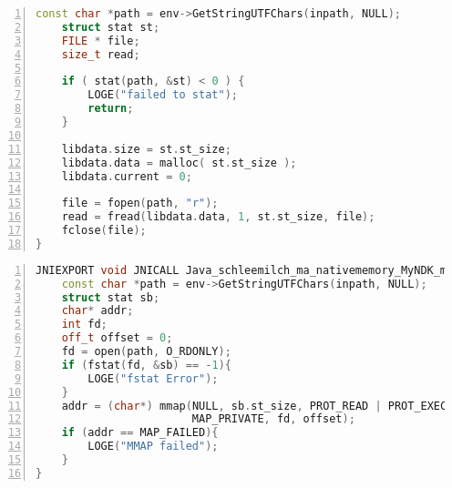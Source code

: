 \begin{appendices}
\begin{lstlisting}[language=C++, caption=File Mapping with malloc(), label=file_mapping_malloc, numbers=left]
    const char *path = env->GetStringUTFChars(inpath, NULL);
    struct stat st;
    FILE * file;
    size_t read;

    if ( stat(path, &st) < 0 ) {
        LOGE("failed to stat");
        return;
    }

    libdata.size = st.st_size;
    libdata.data = malloc( st.st_size );
    libdata.current = 0;

    file = fopen(path, "r");
    read = fread(libdata.data, 1, st.st_size, file);
    fclose(file);
}
\end{lstlisting}
\begin{lstlisting}[language=C++, caption=File Mapping with mmap(), label=file_mapping_mmap, numbers=left]
JNIEXPORT void JNICALL Java_schleemilch_ma_nativememory_MyNDK_mmapFile (JNIEnv *env, jobject obj, jstring inpath){
    const char *path = env->GetStringUTFChars(inpath, NULL);
    struct stat sb;
    char* addr;
    int fd;
    off_t offset = 0;
    fd = open(path, O_RDONLY);
    if (fstat(fd, &sb) == -1){
        LOGE("fstat Error");
    }
    addr = (char*) mmap(NULL, sb.st_size, PROT_READ | PROT_EXEC | PROT_WRITE,
                        MAP_PRIVATE, fd, offset);
    if (addr == MAP_FAILED){
        LOGE("MMAP failed");
    }
}
\end{lstlisting}
\end{appendices}